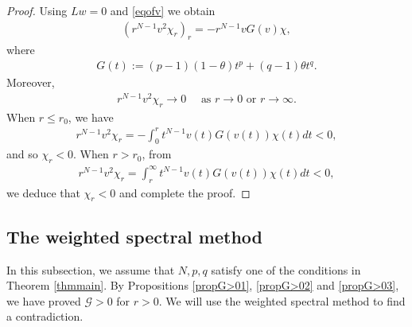 \documentclass{article}
\theoremstyle{definition} \theoremstyle{remark}
\numberwithin{equation}{section}
\newcommand{\G}{\mathcal{G}}
\begin{document}
	\begin{proof}
		Using $Lw=0$ and \eqref{eqofv} we obtain
		\begin{align*}
			\left(r^{N-1}v^2\chi_r\right)_r = -r^{N-1}vG(v)\chi,
		\end{align*}
		where
		\begin{align*}
			G(t) := (p-1)(1-\theta)t^p + (q-1)\theta t^q.
		\end{align*}
		Moreover,
		\begin{align*}
			r^{N-1}v^2\chi_r \to 0 \quad \text{ as } r \to 0 \text{ or } r \to \infty.
		\end{align*}
		When $r \le r_0$, we have
		\begin{align*}
			r^{N-1}v^2\chi_r = -\int_0^r t^{N-1}v(t)G(v(t))\chi(t)dt < 0,
		\end{align*}
		and so $\chi_r < 0$. When $r > r_0$, from
		\begin{align*}
			r^{N-1}v^2\chi_r = \int_r^\infty t^{N-1}v(t)G(v(t))\chi(t)dt < 0,
		\end{align*}
		we deduce that $\chi_r < 0$ and complete the proof.
	\end{proof}

	\subsection{The weighted spectral method} \label{subsecspectralmethod}

	In this subsection, we assume that $N, p, q$ satisfy one of the conditions in Theorem \ref{thmmain}. By Propositions \ref{propG>01}, \ref{propG>02} and \ref{propG>03}, we have proved $\G > 0$ for $r > 0$. We will use the weighted spectral method to find a contradiction.
		
\end{document}
